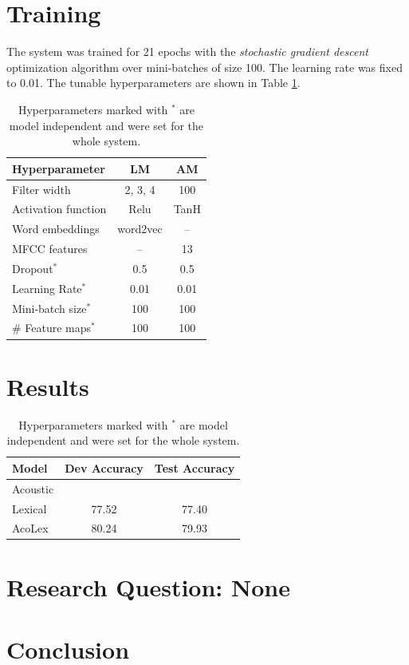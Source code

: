 \documentclass[11pt,a4paper]{article}
\begin{document}
\section{Training}
The system was trained for 21 epochs with the \textit{stochastic gradient descent} optimization algorithm over mini-batches of size 100. The learning rate was fixed to 0.01. The tunable hyperparameters are shown in Table \ref{tab:hyperparameters}.

\begin{table}[h]
	\centering
	\begin{tabular}{ l | c | c}
		\textbf{Hyperparameter} & \textbf{LM} & \textbf{AM} \\
		\hline
		Filter width & 2, 3, 4 & 100 \\
		Activation function & Relu & TanH \\
		Word embeddings & word2vec & -- \\
		MFCC features & -- & 13 \\
		Dropout$^\ast$ & 0.5 & 0.5 \\
		Learning Rate$^\ast$ & 0.01 & 0.01 \\
		Mini-batch size$^\ast$ & 100 & 100 \\
		\# Feature maps$^\ast$ & 100 & 100 \\
	\end{tabular}
	\caption{Hyperparameters marked with $^\ast$ are model independent and were set for the whole system.}
	\label{tab:hyperparameters}
\end{table}	

\section{Results}

\begin{table}[h]
	\centering
	\begin{tabular}{ l | c c}
		\textbf{Model} & Dev Accuracy & Test Accuracy\\
		\hline
		Acoustic & &  \\
		Lexical & 77.52 & 77.40 \\
		AcoLex & 80.24 & 79.93 \\

	\end{tabular}
	\caption{Hyperparameters marked with $^\ast$ are model independent and were set for the whole system.}
	\label{tab:results}
\end{table}	

\section{Research Question: None}

\section{Conclusion}



\nocite{*}
\end{document}
